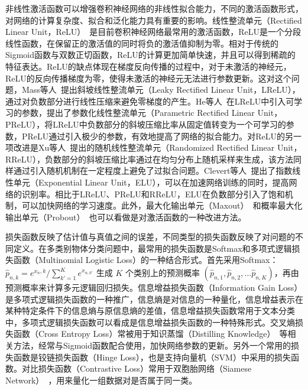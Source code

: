 非线性激活函数可以增强卷积神经网络的非线性拟合能力，不同的激活函数形式，对网络的计算复杂度、拟合和泛化能力具有重要的影响。线性整流单元（Rectified Linear Unit，ReLU）~\cite{nair2010rectified}是目前卷积神经网络最常用的激活函数，ReLU是一个分段线性函数，在保留正的激活值的同时将负的激活值抑制为零。相对于传统的Sigmoid函数与双数正切函数，ReLU的计算更加简单快速，并且可以得到稀疏的特征表达。ReLU的缺点体现在梯度反向传播的过程中，对于未激活的神经元，ReLU的反向传播梯度为零，使得未激活的神经元无法进行参数更新。这对这个问题，Mass等人~\cite{maas2013rectifier}提出斜坡线性整流单元（Leaky Rectified Linear Unit，LReLU），通过对负数部分进行线性压缩来避免零梯度的产生。He等人~\cite{he2015delving}在LReLU中引入可学习的参数，提出了参数化线性整流单元（Parametric Rectified Linear Unit，PReLU），将LReLU中负数部分的斜坡压缩比率从固定值转变为一个可学习的参数，PReLU通过引入极少的参数，有效地提高了网络的拟合能力。对ReLU的另一项改进是Xu等人~\cite{xu2015empirical}提出的随机线性整流单元（Randomized Rectified Linear Unit，RReLU），负数部分的斜坡压缩比率通过在均匀分布上随机采样来生成，该方法同样通过引入随机机制在一定程度上避免了过拟合问题。Clevert等人~\cite{clevert2015fast}提出了指数线性单元（Exponential Linear Unit，ELU），可以在加速网络训练的同时，提高网络的识别率。相比于LReLU、PReLU和RReLU，ELU在负数部分引入了饱和机制，可以加快网络的学习速度。此外，最大化输出单元（Maxout）~\cite{goodfellow2013maxout}和概率最大化输出单元（Probout）~\cite{springenberg2013improving}也可以看做是对激活函数的一种改进方法。

损失函数反映了估计值与真值之间的误差，不同类型的损失函数反映了对问题的不同定义。在多类别物体分类问题中，最常用的损失函数是Softmax和多项式逻辑损失函数（Multinomial Logistic Loss）的一种结合形式。首先采用Softmax：${\hat{p}}_{n,k}=e^{x_n,k}/\sum_{k'=1}^{K}e^{x_{n,k'}}$ 生成 $K$ 个类别上的预测概率 $({\hat{p}}_{n,1}, {\hat{p}}_{n,2}, \dots{\hat{p}}_{n,K})$，再由预测概率来计算多元逻辑回归损失。信息增益损失函数（Information Gain Loss）是多项式逻辑损失函数的一种推广，信息熵是对信息的一种量化，信息增益表示在某种特定条件下的信息熵与原信息熵的差值，信息增益损失函数常用于文本分类中，多项式逻辑损失函数可以看成是信息增益损失函数的一种特殊形式。交叉熵损失函数（Cross Entropy Loss）常被用于知识蒸馏（Distilling Knowledge）~\cite{hinton2015distilling}等相关方法，经常与Sigmoid函数配合使用，加快网络参数的更新。另外一个常用的损失函数是铰链损失函数（Hinge Loss），也是支持向量机（SVM）中采用的损失函数。对比损失函数（Contrastive Loss）常用于双胞胎网络（Siamese Network）~\cite{chopra2005learning}，用来量化一组数据对是否属于同一类。

